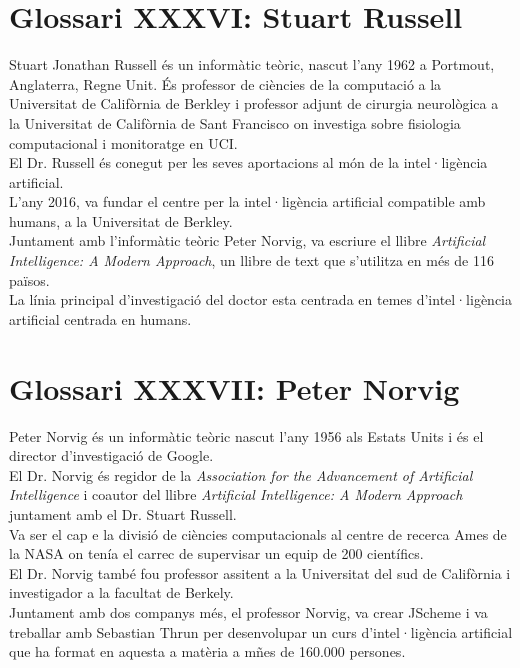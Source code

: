 \documentclass[a4paper,12pt]{report}
\begin{document}
\section*{Glossari XXXVI: Stuart Russell}
Stuart Jonathan Russell és un informàtic teòric, nascut l'any 1962 a Portmout, Anglaterra, Regne Unit. És professor de ciències de la computació a la Universitat de Califòrnia de Berkley i professor adjunt de cirurgia neurològica a la Universitat de Califòrnia de Sant Francisco on investiga sobre fisiologia computacional i monitoratge en UCI.\\
El Dr. Russell és conegut per les seves aportacions al món de la intel·ligència artificial.\\
L'any 2016, va fundar el centre per la intel·ligència artificial compatible amb humans, a la Universitat de Berkley.\\
Juntament amb l'informàtic teòric Peter Norvig, va escriure el llibre \textit{Artificial Intelligence: A Modern Approach}, un llibre de text que s'utilitza en més de 116 països.\\
La línia principal d'investigació del doctor esta centrada en temes d'intel·ligència artificial centrada en humans.
\section*{Glossari XXXVII: Peter Norvig}
Peter Norvig és un informàtic teòric nascut l'any 1956 als Estats Units i és el director d'investigació de Google.\\
El Dr. Norvig és regidor de la \textit{Association for the Advancement of Artificial Intelligence} i coautor del llibre \textit{Artificial Intelligence: A Modern Approach} juntament amb el Dr. Stuart Russell.\\
Va ser el cap e la divisió de ciències computacionals al centre de recerca Ames de la NASA on tenía el carrec de supervisar un equip de 200 científics.\\
El Dr. Norvig també fou professor assitent a la Universitat del sud de Califòrnia i investigador a la facultat de Berkely.\\
Juntament amb dos companys més, el professor Norvig, va crear JScheme i va treballar amb Sebastian Thrun per desenvolupar un curs d'intel·ligència artificial que ha format en aquesta a matèria a mñes de 160.000 persones.
\end{document}
